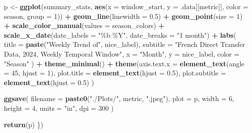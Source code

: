 \documentclass[
]{article}
\newenvironment{Shaded}{\begin{snugshade}}{\end{snugshade}}
\newcommand{\AttributeTok}[1]{\textcolor[rgb]{0.13,0.29,0.53}{#1}}
\newcommand{\DecValTok}[1]{\textcolor[rgb]{0.00,0.00,0.81}{#1}}
\newcommand{\FloatTok}[1]{\textcolor[rgb]{0.00,0.00,0.81}{#1}}
\newcommand{\FunctionTok}[1]{\textcolor[rgb]{0.13,0.29,0.53}{\textbf{#1}}}
\newcommand{\NormalTok}[1]{#1}
\newcommand{\OtherTok}[1]{\textcolor[rgb]{0.56,0.35,0.01}{#1}}
\newcommand{\SpecialCharTok}[1]{\textcolor[rgb]{0.81,0.36,0.00}{\textbf{#1}}}
\newcommand{\StringTok}[1]{\textcolor[rgb]{0.31,0.60,0.02}{#1}}
\begin{document}
\begin{Shaded}
\begin{Highlighting}[]
\NormalTok{   p }\OtherTok{\textless{}{-}} \FunctionTok{ggplot}\NormalTok{(summary\_stats, }
              \FunctionTok{aes}\NormalTok{(}\AttributeTok{x =}\NormalTok{ window\_start,}
                  \AttributeTok{y =}\NormalTok{ .data[[metric]],}
                  \AttributeTok{color =}\NormalTok{ season,}
                  \AttributeTok{group =} \DecValTok{1}\NormalTok{)) }\SpecialCharTok{+}
    \FunctionTok{geom\_line}\NormalTok{(}\AttributeTok{linewidth =} \FloatTok{0.5}\NormalTok{) }\SpecialCharTok{+}
    \FunctionTok{geom\_point}\NormalTok{(}\AttributeTok{size =} \DecValTok{1}\NormalTok{) }\SpecialCharTok{+}
    \FunctionTok{scale\_color\_manual}\NormalTok{(}\AttributeTok{values =}\NormalTok{ season\_colors) }\SpecialCharTok{+}
    \FunctionTok{scale\_x\_date}\NormalTok{(}\AttributeTok{date\_labels =} \StringTok{"\%b \%Y"}\NormalTok{, }\AttributeTok{date\_breaks =} \StringTok{"1 month"}\NormalTok{) }\SpecialCharTok{+}
    \FunctionTok{labs}\NormalTok{(}
      \AttributeTok{title =} \FunctionTok{paste}\NormalTok{(}\StringTok{"Weekly Trend of"}\NormalTok{, nice\_label),}
      \AttributeTok{subtitle =} \StringTok{"French Direct Transfer Data, 2024, Weekly Temporal Window"}\NormalTok{, }
      \AttributeTok{x =} \StringTok{"Month"}\NormalTok{,}
      \AttributeTok{y =}\NormalTok{ nice\_label,}
      \AttributeTok{color =} \StringTok{"Season"}
\NormalTok{    ) }\SpecialCharTok{+}
    \FunctionTok{theme\_minimal}\NormalTok{() }\SpecialCharTok{+}
    \FunctionTok{theme}\NormalTok{(}\AttributeTok{axis.text.x =} \FunctionTok{element\_text}\NormalTok{(}\AttributeTok{angle =} \DecValTok{45}\NormalTok{, }\AttributeTok{hjust =} \DecValTok{1}\NormalTok{),}
          \AttributeTok{plot.title =} \FunctionTok{element\_text}\NormalTok{(}\AttributeTok{hjust =} \FloatTok{0.5}\NormalTok{),}
          \AttributeTok{plot.subtitle =} \FunctionTok{element\_text}\NormalTok{(}\AttributeTok{hjust =} \FloatTok{0.5}\NormalTok{)}
\NormalTok{          )}
  
   \FunctionTok{ggsave}\NormalTok{(}
    \AttributeTok{filename =} \FunctionTok{paste0}\NormalTok{(}\StringTok{"./Plots/"}\NormalTok{, metric, }\StringTok{".jpeg"}\NormalTok{),}
    \AttributeTok{plot =}\NormalTok{ p,}
    \AttributeTok{width =} \DecValTok{6}\NormalTok{,}
    \AttributeTok{height =} \DecValTok{4}\NormalTok{,}
    \AttributeTok{units =} \StringTok{"in"}\NormalTok{,}
    \AttributeTok{dpi =} \DecValTok{300}
\NormalTok{  )}
  
  \FunctionTok{return}\NormalTok{(p)}
\NormalTok{\})}
\end{Highlighting}
\end{Shaded}
\end{document}
